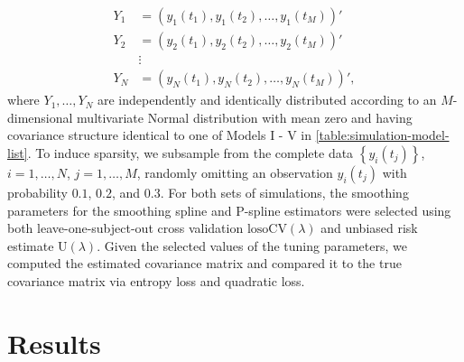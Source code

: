 \begin{align*}
Y_1 &= \left(y_1\left(t_1\right), y_1\left(t_2\right), \dots, y_1\left(t_M\right)\right)' \\
Y_2 &= \left(y_2\left(t_1\right), y_2\left(t_2\right), \dots, y_2\left(t_M\right)\right)' \\
&\vdots \\
Y_N &= \left(y_N\left(t_1\right), y_N\left(t_2\right), \dots, y_N\left(t_M\right)\right)',
\end{align*}
\noindent
where $Y_1,\dots, Y_N$ are independently and identically distributed according to an $M$-dimensional multivariate Normal distribution with mean zero and having covariance structure identical to one of Models I - V in \ref{table:simulation-model-list}. To induce sparsity, we subsample from the complete data $\left\{y_i\left(t_j\right) \right\}$, $i = 1,\dots, N$, $j = 1,\dots, M$, randomly omitting an observation $y_i\left(t_j\right)$ with probability $0.1$, $0.2$, and $0.3$. For both sets of simulations, the smoothing parameters for the smoothing spline and P-spline estimators were selected using both leave-one-subject-out cross validation $\mbox{losoCV}\left(\lambda\right)$ and unbiased risk estimate $\mbox{U}\left(\lambda\right)$. Given the selected values of the tuning parameters, we computed the estimated covariance matrix and compared it to the true covariance matrix via entropy loss and quadratic loss. 


\section{Results}

